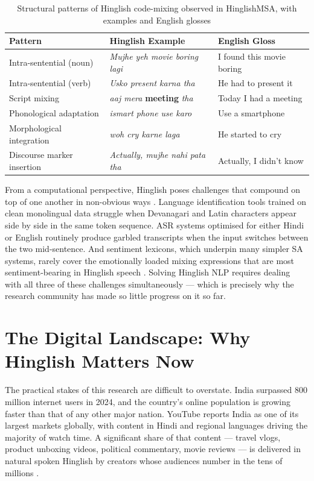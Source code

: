\begin{table}[ht]
\centering
\caption{Structural patterns of Hinglish code-mixing observed in HinglishMSA, with examples and English glosses}
\label{tab:mixing_examples}
\renewcommand{\arraystretch}{1.35}
\begin{tabular}{p{3.2cm} p{5.0cm} p{4.2cm}}
\toprule
\textbf{Pattern} & \textbf{Hinglish Example} & \textbf{English Gloss} \\
\midrule
Intra-sentential (noun) & \textit{Mujhe yeh movie boring lagi} & I found this movie boring \\
Intra-sentential (verb) & \textit{Usko present karna tha} & He had to present it \\
Script mixing & \textit{aaj mera} \textbf{meeting} \textit{tha} & Today I had a meeting \\
Phonological adaptation & \textit{ismart phone use karo} & Use a smartphone \\
Morphological integration & \textit{woh cry karne laga} & He started to cry \\
Discourse marker insertion & \textit{Actually, mujhe nahi pata tha} & Actually, I didn't know \\
\bottomrule
\end{tabular}
\end{table}

From a computational perspective, Hinglish poses challenges that compound on top of one another in non-obvious ways \cite{aguilar2020lince}. Language identification tools trained on clean monolingual data struggle when Devanagari and Latin characters appear side by side in the same token sequence. ASR systems optimised for either Hindi or English routinely produce garbled transcripts when the input switches between the two mid-sentence. And sentiment lexicons, which underpin many simpler SA systems, rarely cover the emotionally loaded mixing expressions that are most sentiment-bearing in Hinglish speech \cite{winata2019code}. Solving Hinglish NLP requires dealing with all three of these challenges simultaneously --- which is precisely why the research community has made so little progress on it so far.

\section{The Digital Landscape: Why Hinglish Matters Now}

The practical stakes of this research are difficult to overstate. India surpassed 800 million internet users in 2024, and the country's online population is growing faster than that of any other major nation. YouTube reports India as one of its largest markets globally, with content in Hindi and regional languages driving the majority of watch time. A significant share of that content --- travel vlogs, product unboxing videos, political commentary, movie reviews --- is delivered in natural spoken Hinglish by creators whose audiences number in the tens of millions \cite{touvron2023llama}.

